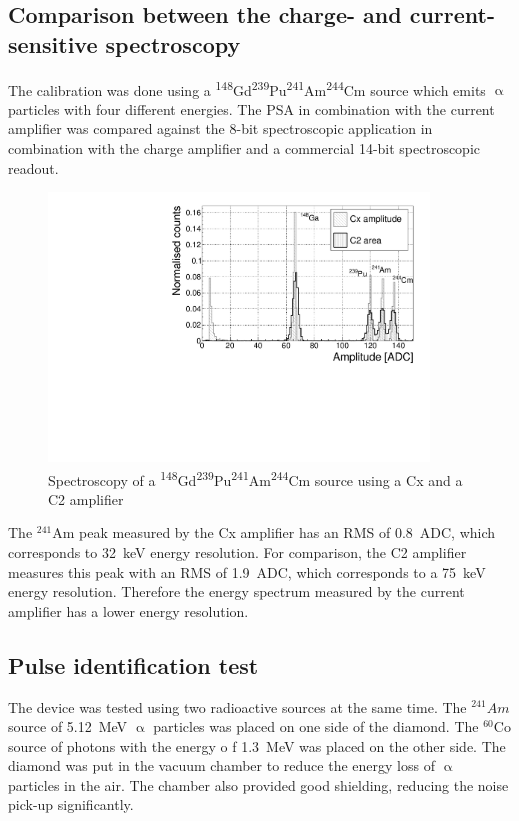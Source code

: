 \documentclass[12pt]{packages/mytustyle}  %
\begin{document}
\subsection{Comparison between the charge- and current-sensitive spectroscopy}
The calibration was done using a \textsuperscript{148}Gd\textsuperscript{239}Pu\textsuperscript{241}Am\textsuperscript{244}Cm source which emits $\upalpha$ particles with four different energies. The PSA in combination with the current amplifier was compared against the 8-bit spectroscopic application in combination with the charge amplifier and a commercial 14-bit spectroscopic readout.

\begin{figure}[!t]
\centering
\includegraphics[width=0.9\textwidth]{../../scripts/05_current_monitoring/plot4alpha/plots/4alphaCompare}
\caption{Spectroscopy of a \textsuperscript{148}Gd\textsuperscript{239}Pu\textsuperscript{241}Am\textsuperscript{244}Cm source using a Cx and a C2 amplifier}
\label{fig:c2cx4alpha}
\end{figure}
The $^{241}$Am peak measured by the Cx amplifier has an RMS of 0.8~ADC, which corresponds to 32~keV energy resolution. For comparison, the C2 amplifier measures this peak with an RMS of 1.9~ADC, which corresponds to a 75~keV energy resolution. Therefore the energy spectrum measured by the current amplifier has a lower energy resolution.


\subsection{Pulse identification test}
The device was tested using two radioactive sources at the same time. The $^{241}Am$ source of 5.12~MeV $\upalpha$ particles was placed on one side of the diamond. The $^{60}$Co source of photons with the energy o f 1.3~MeV was placed on the other side. The diamond was put in the vacuum chamber to reduce the energy loss of $\upalpha$ particles in the air. The chamber also provided good shielding, reducing the noise pick-up significantly. 
\end{document}
